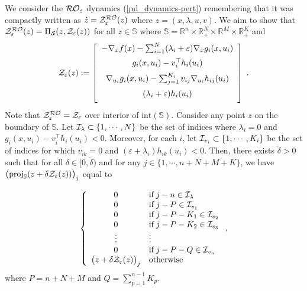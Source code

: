 \documentclass[journal,twoside,web]{ieeecolor}
\begin{document}
We consider the ${\cal RO}_\varepsilon$ dynamics (\ref{pd_dynamics-pert}) remembering that it was compactly written as $\dot z={\cal Z}^{\cal RO}_\varepsilon(z)$ where $z=(x,\lambda,u,v)$. We aim to show that ${\cal Z}^{\cal RO}_\varepsilon(z)=\Pi_{\mathcal S}(z,{\cal Z}_\varepsilon(z))$ for all $z \in {\mathbb S}$ where ${\mathbb S}=\mathbb{R}^n\times \mathbb{R}^N_{+}\times \mathbb{R}^M\times \mathbb{R}^K_+$ and
\begin{align} \label{pd_dynamics_no_projection}
{\cal Z}_\varepsilon(z):=
\left[\begin{array}{cc}
\vspace{2mm}
-\nabla_x f(x)-\sum_{i=1}^N (\lambda_i+\varepsilon) \nabla_x g_i(x,u_i)\\
\vspace{2mm}
g_i(x,u_i)-v_i^\top h_i(u_i)\\
\vspace{2mm}
\nabla_{u_i}g_i(x,u_i)-\sum_{j=1}^{K_i} v_{ij} \nabla_{u_i} h_{ij}(u_i)\\
\vspace{2mm}
(\lambda_i+\varepsilon) h_i(u_i)
\end{array}\right]\;.
\end{align}
Note that ${\cal Z}^{\cal RO}_\varepsilon={\cal Z}_\varepsilon$ over interior of $\text{int}(\mathbb S)$. Consider any point $z$ on the boundary of $\mathbb S$. Let ${\cal I}_\lambda \subset \{1,\cdots,N\}$ be the set of indices where $\lambda_i=0$ and $g_i(x,u_i)-v_i^\top h_i(u_i)<0$\;. Moreover, for each $i$, let ${\cal I}_{v_i} \subset \{1,\cdots,K_i\}$ be the set of indices for which $v_{ik}=0$ and $(\varepsilon+\lambda_i) h_{ik}(u_i)<0$. Then, there exists $\tilde \delta > 0$ such that for all $\delta \in [0,\tilde \delta)$ and for any $j \in \{1,\cdots,n+N+M+K\}$, we have $\big(\text{proj}_{\mathbb S}(z+\delta {\cal Z}_\varepsilon(z))\big)_j$ equal to

\begin{align*}
\left\{
\begin{array}{cl}
0 & \text{if} \; j-n \in {\cal I}_\lambda\\
0 & \text{if} \; j-P \in {\cal I}_{v_1}\\
0 &  \text{if} \; j-P-K_1 \in {\cal I}_{v_2}\\
0 &  \text{if} \; j-P-K_2 \in {\cal I}_{v_3}\\
\vdots & \vdots\\
0 & \text{if} \; j-P-Q \in {\cal I}_{v_n}\\
\big(z+\delta {\cal Z}_\varepsilon(z)\big)_j & \text{otherwise}
\end{array}\right.,
\end{align*}
where $P=n+N+M$ and $Q=\sum_{p=1}^{n-1} K_p$\;.
\end{document}
